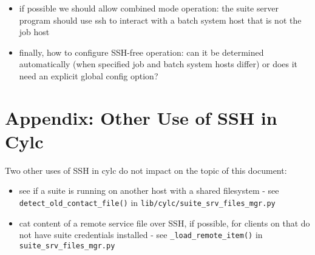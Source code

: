 \documentclass{article}
\begin{document}
\begin{itemize}
  \item if possible we should allow combined mode operation: the suite server
    program should use ssh to interact with a batch system host that is not the
    job host

  \item finally, how to configure SSH-free operation: can it be determined
    automatically (when specified job and batch system hosts differ) or does it
    need an explicit global config option?
\end{itemize}

\section{Appendix: Other Use of SSH in Cylc}

Two other uses of SSH in cylc do not impact on the topic of this document:

\begin{itemize}
  \item see if a suite is running on another host with a shared
    filesystem - see \lstinline=detect_old_contact_file()= in
    \lstinline=lib/cylc/suite_srv_files_mgr.py=
  \item cat content of a remote service file over SSH, if possible, for clients
    on that do not have suite credentials installed - see
    \lstinline=_load_remote_item()= in \lstinline=suite_srv_files_mgr.py=
\end{itemize}
\end{document}
